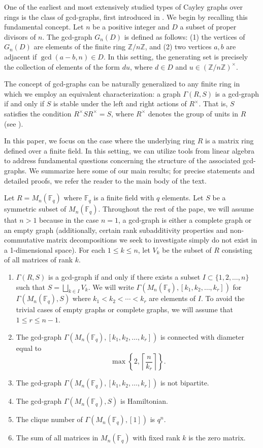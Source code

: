 \documentclass[12pt, a4paper]{amsart}
\theoremstyle{definition}
\numberwithin{equation}{section}
\newcommand{\F}{\mathbb{F}}
\begin{document}
One of the earliest and most extensively studied types of Cayley graphs over rings is the class of gcd-graphs, first introduced in \cite{klotz2007some}. We begin by recalling this fundamental concept. Let $n$ be a positive integer and $D$ a subset of proper divisors of $n$. The gcd-graph $G_n(D)$ is defined as follows: (1) the vertices of $G_n(D)$ are elements of the finite ring $\mathbb{Z}/n\mathbb{Z}$, and (2) two vertices $a, b$ are adjacent if $\gcd(a-b, n) \in D$. In this setting, the generating set is precisely the collection of elements of the form $du$, where $d \in D$ and $u \in (\mathbb{Z}/n\mathbb{Z})^{\times}$.

The concept of gcd-graphs can be naturally generalized to any finite ring in which we employ an equivalent characterization: a graph $\Gamma(R,S)$ is a gcd-graph if and only if $S$ is stable under the left and right actions of $R^{\times}$. That is, $S$ satisfies the condition $R^{\times} S R^{\times} = S$, where $R^{\times}$ denotes the group of units in $R$ (see \cite{pst-gcd-new-2,minavc2024gcd, nguyengcd2026, nguyen2026u, pst-gcd-new}).

In this paper, we focus on the case where the underlying ring $R$ is a matrix ring defined over a finite field. In this setting, we can utilize tools from linear algebra to address fundamental questions concerning the structure of the associated gcd-graphs. We summarize here some of our main results; for precise statements and detailed proofs, we refer the reader to the main body of the text.

Let $R=M_n(\F_q)$ where $\F_q$ is a finite field with $q$ elements. Let $S$ be a symmetric subset of $M_n(\F_q)$. Throughout the rest of the pape, we will assume that $n>1$ because in the case $n=1$, a gcd-graph is either a complete graph or an empty graph (additionally, certain rank subadditivity properties and non-commutative matrix decompositions we seek to investigate simply do not exist in a 1-dimensional space). For each $1 \leq k \leq n$, let $V_k$ be the subset of $R$ consisting of all matrices of rank $k.$
\begin{enumerate}
    \item $\Gamma(R,S)$ is a gcd-graph if and only if there exists a subset $I \subset \{1, 2, \ldots, n\}$ such that $S= \bigsqcup_{k \in I} V_k.$ We will write $\Gamma(M_n(\F_q), [k_1, k_2, \ldots, k_r])$ for $\Gamma(M_n(\F_q),S)$ where $k_1<k_2< \cdots <k_r$ are elements of $I.$ To avoid the trivial cases of empty graphs or complete graphs, we will assume that $1 \leq r \leq n-1$.
    \item The gcd-graph $\Gamma(M_n(\F_q), [k_1, k_2, \ldots, k_r])$ is connected with diameter equal to
        \[ \max \left\{2, \left\lceil \frac{n}{k_{r}} \right\rceil \right\}. \]
    \item The gcd-graph $\Gamma(M_n(\F_q), [k_1, k_2, \ldots, k_r])$ is not bipartite. 
    \item The gcd-graph $\Gamma(M_n(\F_q), S)$ is Hamiltonian. 
    \item The clique number of $\Gamma(M_n(\F_q), [1])$ is $q^n$.
    \item   The sum of all matrices in $M_n(\F_q)$ with fixed rank $k$ is the zero matrix.
\end{enumerate}
\end{document}
